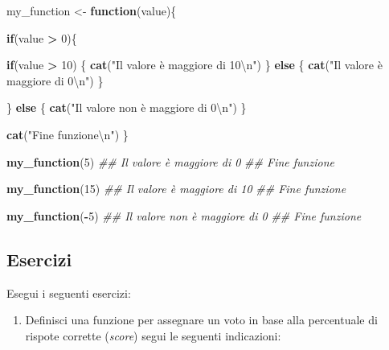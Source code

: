 \documentclass[
]{book}
\newenvironment{Shaded}{\begin{snugshade}}{\end{snugshade}}
\newcommand{\CharTok}[1]{\textcolor[rgb]{0.31,0.60,0.02}{#1}}
\newcommand{\CommentTok}[1]{\textcolor[rgb]{0.56,0.35,0.01}{\textit{#1}}}
\newcommand{\ControlFlowTok}[1]{\textcolor[rgb]{0.13,0.29,0.53}{\textbf{#1}}}
\newcommand{\DecValTok}[1]{\textcolor[rgb]{0.00,0.00,0.81}{#1}}
\newcommand{\KeywordTok}[1]{\textcolor[rgb]{0.13,0.29,0.53}{\textbf{#1}}}
\newcommand{\NormalTok}[1]{#1}
\newcommand{\OperatorTok}[1]{\textcolor[rgb]{0.81,0.36,0.00}{\textbf{#1}}}
\newcommand{\StringTok}[1]{\textcolor[rgb]{0.31,0.60,0.02}{#1}}
\providecommand{\tightlist}{%
  \setlength{\itemsep}{0pt}\setlength{\parskip}{0pt}}
\begin{document}
\begin{Shaded}
\begin{Highlighting}[]
\NormalTok{my_function <-}\StringTok{ }\ControlFlowTok{function}\NormalTok{(value)\{}
  
  \ControlFlowTok{if}\NormalTok{(value }\OperatorTok{>}\StringTok{ }\DecValTok{0}\NormalTok{)\{}
    
    \ControlFlowTok{if}\NormalTok{(value }\OperatorTok{>}\StringTok{ }\DecValTok{10}\NormalTok{) \{}
      \KeywordTok{cat}\NormalTok{(}\StringTok{"Il valore è maggiore di 10}\CharTok{\textbackslash{}n}\StringTok{"}\NormalTok{)}
\NormalTok{    \} }\ControlFlowTok{else}\NormalTok{ \{}
      \KeywordTok{cat}\NormalTok{(}\StringTok{"Il valore è maggiore di 0}\CharTok{\textbackslash{}n}\StringTok{"}\NormalTok{)}
\NormalTok{    \}}
    
\NormalTok{  \} }\ControlFlowTok{else}\NormalTok{ \{}
    \KeywordTok{cat}\NormalTok{(}\StringTok{"Il valore non è maggiore di 0}\CharTok{\textbackslash{}n}\StringTok{"}\NormalTok{)}
\NormalTok{  \}}
  
  \KeywordTok{cat}\NormalTok{(}\StringTok{"Fine funzione}\CharTok{\textbackslash{}n}\StringTok{"}\NormalTok{)}
\NormalTok{\}}

\KeywordTok{my_function}\NormalTok{(}\DecValTok{5}\NormalTok{)}
\CommentTok{## Il valore è maggiore di 0}
\CommentTok{## Fine funzione}

\KeywordTok{my_function}\NormalTok{(}\DecValTok{15}\NormalTok{)}
\CommentTok{## Il valore è maggiore di 10}
\CommentTok{## Fine funzione}

\KeywordTok{my_function}\NormalTok{(}\OperatorTok{-}\DecValTok{5}\NormalTok{)}
\CommentTok{## Il valore non è maggiore di 0}
\CommentTok{## Fine funzione}
\end{Highlighting}
\end{Shaded}

\hypertarget{esercizi-15}{%
\subsection*{Esercizi}\label{esercizi-15}}

Esegui i seguenti esercizi:

\begin{enumerate}
\def\labelenumi{\arabic{enumi}.}
\tightlist
\item
  Definisci una funzione per assegnare un voto in base alla percentuale di rispote corrette (\emph{score}) segui le seguenti indicazioni:
\end{enumerate}
\end{document}
